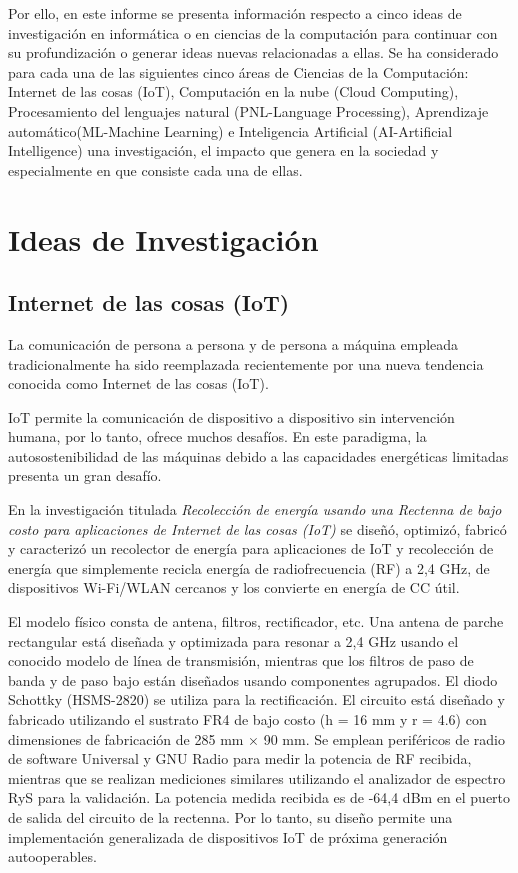 \documentclass[10pt,journal]{IEEEtran}
\begin{document}
Por ello, en este informe se presenta información respecto a cinco ideas de investigación en informática o en ciencias de la computación para continuar con su profundización o generar ideas nuevas relacionadas a ellas. Se ha considerado para cada una de las siguientes cinco áreas de Ciencias de la Computación: Internet de las cosas (IoT), Computación en la nube (Cloud Computing), Procesamiento del lenguajes natural (PNL-Language Processing), Aprendizaje automático(ML-Machine Learning) e Inteligencia Artificial (AI-Artificial Intelligence) una investigación, el impacto que genera en la sociedad y especialmente en que consiste cada una de ellas.
\section{\textbf{Ideas de Investigación}}
\subsection{\textbf{Internet de las cosas (IoT)}}
La comunicación de persona a persona y de persona a máquina empleada tradicionalmente ha sido reemplazada recientemente por una nueva tendencia conocida como Internet de las cosas (IoT).\par IoT permite la comunicación de dispositivo a dispositivo sin intervención humana, por lo tanto, ofrece muchos desafíos. En este paradigma, la autosostenibilidad de las máquinas debido a las capacidades energéticas limitadas presenta un gran desafío.\par
En la investigación titulada \textit{Recolección de energía usando una Rectenna de bajo costo para aplicaciones de Internet de las cosas (IoT)} \citep{internet} se diseñó, optimizó, fabricó y caracterizó un recolector de energía para aplicaciones de IoT y recolección de energía que simplemente recicla energía de radiofrecuencia (RF) a 2,4 GHz, de dispositivos Wi-Fi/WLAN cercanos y los convierte en energía de CC útil.\par
El modelo físico consta de antena, filtros, rectificador, etc. Una antena de parche rectangular está diseñada y optimizada para resonar a 2,4 GHz usando el conocido modelo de línea de transmisión, mientras que los filtros de paso de banda y de paso bajo están diseñados usando componentes agrupados. El diodo Schottky (HSMS-2820) se utiliza para la rectificación. El circuito está diseñado y fabricado utilizando el sustrato FR4 de bajo costo (h = 16 mm y r = 4.6) con dimensiones de fabricación de 285 mm × 90 mm. Se emplean periféricos de radio de software Universal y GNU Radio para medir la potencia de RF recibida, mientras que se realizan mediciones similares utilizando el analizador de espectro RyS para la validación. La potencia medida recibida es de -64,4 dBm en el puerto de salida del circuito de la rectenna. Por lo tanto, su diseño permite una implementación generalizada de dispositivos IoT de próxima generación autooperables.
\end{document}
